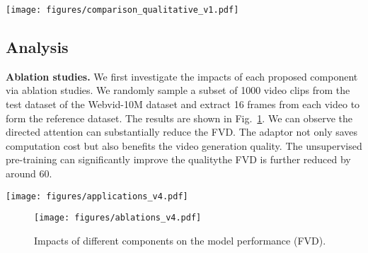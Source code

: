 \documentclass[10pt,twocolumn,letterpaper]{article}
\newcommand{\myPara}[1]{\vspace{6pt}\noindent\textbf{#1}}
\begin{document}
\begin{figure*}[h]
    \centering
    \texttt{[image: figures/comparison\_qualitative\_v1.pdf]}
    \caption{\textbf{Qualitative results comparison with recent strong methods}: VDM \cite{ho_video_2022}, CogVideo \cite{CogVideo}, and Make-A-Video~\cite{singer_make--video_2022}.  (a) The sample videos   are generated with text input ``Busy freeway at night", where the samples of the VDM are taken from~\cite{singer_make--video_2022}; (b) \& (c)  the samples are generated with the text ``A blue colored dog" and ``A pyramid made of falafel with a partial solar eclipse in the background" respectively. See Tab. \ref{tab:eval_human} for detailed comparison with CogVideo. } \label{fig:visual_results}
\end{figure*}
\subsection{Analysis}

\myPara{Ablation studies.} We first investigate the impacts of each proposed component via ablation studies. We randomly sample a subset of 1000 video clips from the test dataset of the Webvid-10M dataset and extract 16 frames from each video to form the reference dataset. The results are shown in Fig.~\ref{fig:ablation_FID}. We can observe the directed attention can substantially reduce the FVD. The adaptor not only saves computation cost but also benefits the video generation quality. The unsupervised pre-training can significantly improve the quality\textemdash the FVD is further reduced by around 60.


\begin{figure*}[t!] 
\centering
\texttt{[image: figures/applications\_v4.pdf]}
\vspace{-3mm}
\caption{\textbf{Applications based on MagicVideo.} The {{\bf green  bounding box}} denotes the source image/video frames. (a)    The video variation results. (b)    Given video clip of a driving bus,  we use text prompt of ``candies falling onto the ground" to MagicVideo for video editing. (c) Given an input image, MagicVideo can generate a short relevant video.  }
\vspace{-3mm}
\label{fig:applications}
\end{figure*}

\begin{figure}[h] 
\centering
\texttt{[image: figures/ablations\_v4.pdf]}
\caption{Impacts of different components on the model  performance (FVD).}
\label{fig:ablation_FID}
\end{figure}
\end{document}

